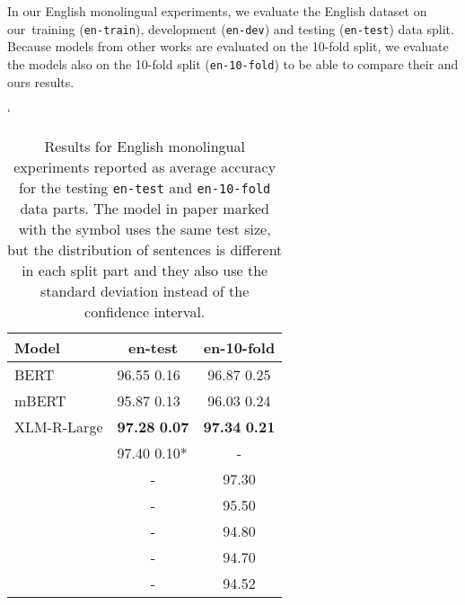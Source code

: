 \documentclass[10pt, a4paper]{article}
\begin{document}
\par In our English monolingual experiments, we evaluate the English dataset on our~training (\texttt{en-train}), development (\texttt{en-dev}) and testing (\texttt{en-test}) data split.  Because models from other works \cite{zhao2015self-adasent,CNN-MCFA-subj-2018,khodak-etal-2018-la-byte-mLSTM7,reimers-gurevych-2019-sentence,nandi2021empirical-indove-subj} are evaluated on the 10-fold split, we evaluate the models also on the 10-fold split (\texttt{en-10-fold}) to be able to compare their and ours results.

\begin{table}[ht!]
\catcode`
\begin{adjustbox}{width=0.99\linewidth,center}
\begin{tabular}{llc} \toprule
Model                  & \multicolumn{1}{c}{en-test} & \multicolumn{1}{c}{en-10-fold} \\ \midrule
BERT             & 96.55  0.16                 & 96.87  0.25              \\
mBERT            & 95.87  0.13                 & 96.03  0.24              \\
XLM-R-Large            & \textbf{97.28}  \textbf{0.07}                 & \textbf{97.34}  \textbf{0.21}              \\ \hdashline
\cite{wang2021entailment-few-shot-learner}                    & \multicolumn{1}{l}{97.40  0.10*}                         &  \multicolumn{1}{c}{-}                           \\

\cite{nandi2021empirical-indove-subj} &   \multicolumn{1}{c}{-}                              & 97.30                        \\

\cite{zhao2015self-adasent}               & \multicolumn{1}{c}{-}                              & \multicolumn{1}{c}{95.50}                        \\
\cite{CNN-MCFA-subj-2018}               &  \multicolumn{1}{c}{-}                              & \multicolumn{1}{c}{94.80}                        \\
\cite{khodak-etal-2018-la-byte-mLSTM7}            &  \multicolumn{1}{c}{-}                              & \multicolumn{1}{c}{94.70} \\

\cite{reimers-gurevych-2019-sentence}        &  \multicolumn{1}{c}{-}                              & \multicolumn{1}{c}{94.52} \\ 
\bottomrule                     
\end{tabular}
\end{adjustbox}
\caption{Results for English monolingual experiments reported as average accuracy for the testing \texttt{en-test} and \texttt{en-10-fold} data parts. The model in paper marked with the  symbol uses the same test size, but the distribution of sentences is different in each split part and they also use the standard deviation instead of the confidence interval.} \label{tab:monolingual-en}
\end{table}
\end{document}
